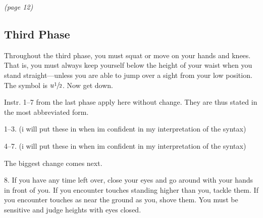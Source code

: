 \documentclass[10pt,twoside,draft]{memoir}
\begin{document}
{{

\clearpage 

\emph{(page 12)}

\subsection*{Third Phase}

Throughout the third phase, you must squat or move on your hands 
and knees. That is, you must always keep yourself below the height of your 
waist when you stand straight---unless you are able to jump over a sight from 
your low position. The symbol is $u\sfrac{1}{2}$. Now get down. 

Instr. 1--7 from the last phase apply here without change. They are thus 
stated in the most abbreviated form. 

1--3.
(i will put these in when im confident in my interpretation of the syntax)

4--7.
(i will put these in when im confident in my interpretation of the syntax)

The biggest change comes next. 

8. If you have any time left over, close your eyes and go around with 
your hands in front of you. If you encounter touches standing higher than 
you, tackle them. If you encounter touches as near the ground as you, shove 
them. You must be sensitive and judge heights with eyes closed. 

}}
\end{document}
